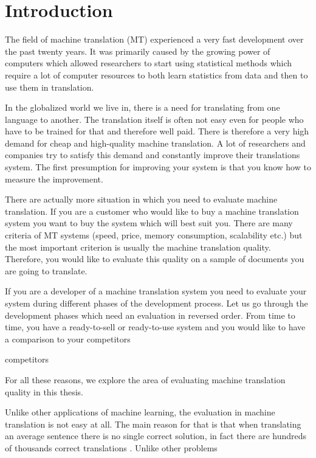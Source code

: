 \chapter{Introduction}

The field of machine translation (MT) experienced a very fast development over
the past twenty years. It was primarily caused by the growing power of
computers which allowed researchers to start using statistical methods which
require a lot of computer resources to both learn statistics from data and then
to use them in translation.

In the globalized world we live in, there is a need for translating from one
language to another. The translation itself is often not easy even for people
who have to be trained for that and therefore well paid. There is therefore a
very high demand for cheap and high-quality machine translation. A lot of
researchers and companies try to satisfy this demand and constantly improve
their translations system. The first presumption for improving your system is
that you know how to measure the improvement.

There are actually more situation in which you need to evaluate machine
translation. If you are a customer who would like to buy a machine translation
system you want to buy the system which will best suit you. There are many
criteria of MT systems (speed, price, memory consumption, scalability etc.) but
the most important criterion is usually the machine translation quality.
Therefore, you would like to evaluate this quality on a sample of documents you
are going to translate.

If you are a developer of a machine translation system you need to evaluate
your system during different phases of the development process. Let us go
through the development phases which need an evaluation in reversed order. From
time to time, you have a ready-to-sell or ready-to-use system and you would like
to have a comparison to your competitors

competitors


For all these reasons, we explore the area of evaluating machine translation
quality in this thesis.

Unlike other applications of machine learning, the evaluation in machine
translation is not easy at all. The main reason for that is that when
translating an average sentence there is no single correct solution, in fact
there are hundreds of thousands correct translations
. Unlike other problems




